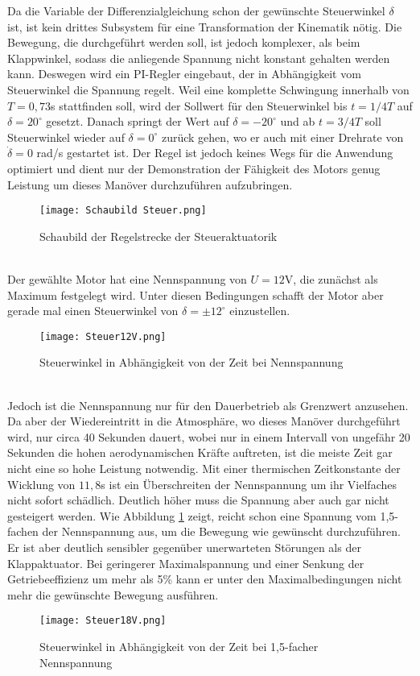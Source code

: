Da die Variable der Differenzialgleichung schon der gewünschte Steuerwinkel $\delta$ ist, ist kein drittes Subsystem für eine Transformation der Kinematik nötig. Die Bewegung, die durchgeführt werden soll, ist jedoch komplexer, als beim Klappwinkel, sodass die anliegende Spannung nicht konstant gehalten werden kann. Deswegen wird ein PI-Regler eingebaut, der in Abhängigkeit vom Steuerwinkel die Spannung regelt.
Weil eine komplette Schwingung innerhalb von $T = 0,73$s stattfinden soll, wird der Sollwert für den Steuerwinkel bis $t = 1/4T$ auf $\delta = 20^\circ$ gesetzt. Danach springt der Wert auf $\delta = -20^\circ$ und ab $t = 3/4T$ soll Steuerwinkel wieder auf $\delta = 0^\circ$ zurück gehen, wo er auch mit einer Drehrate von $\dot{\delta} = 0$ rad/s gestartet ist.
Der Regel ist jedoch keines Wegs für die Anwendung optimiert und dient nur der Demonstration der Fähigkeit des Motors genug Leistung um dieses Manöver durchzuführen aufzubringen.
\begin{figure}[h] 
	\centering
	\texttt{[image: Schaubild Steuer.png]}
	\caption{Schaubild der Regelstrecke der Steueraktuatorik}
\end{figure}\\
Der gewählte Motor hat eine Nennspannung von $U = 12$V, die zunächst als Maximum festgelegt wird. Unter diesen Bedingungen schafft der Motor aber gerade mal einen Steuerwinkel von $\delta = \pm 12^\circ$ einzustellen.
\begin{figure}[h] 
	\centering
	\texttt{[image: Steuer12V.png]}
	\caption{Steuerwinkel in Abhängigkeit von der Zeit bei Nennspannung}
\end{figure}\\
 Jedoch ist die Nennspannung nur für den Dauerbetrieb als Grenzwert anzusehen. Da aber der Wiedereintritt in die Atmosphäre, wo dieses Manöver durchgeführt wird, nur circa 40 Sekunden dauert, wobei nur in einem Intervall von ungefähr 20 Sekunden die hohen aerodynamischen Kräfte auftreten, ist die meiste Zeit gar nicht eine so hohe Leistung notwendig. Mit einer thermischen Zeitkonstante der Wicklung von $11,8$s ist ein Überschreiten der Nennspannung um ihr Vielfaches nicht sofort schädlich. Deutlich höher muss die Spannung aber auch gar nicht gesteigert werden. Wie Abbildung \ref{abb_Steuer18V} zeigt, reicht schon eine Spannung vom 1,5-fachen der Nennspannung aus, um die Bewegung wie gewünscht durchzuführen. Er ist aber deutlich sensibler gegenüber unerwarteten Störungen als der Klappaktuator. Bei geringerer Maximalspannung und einer Senkung der Getriebeeffizienz um mehr als 5\% kann er unter den Maximalbedingungen nicht mehr die gewünschte Bewegung ausführen.
\begin{figure}[h] 
\centering
\texttt{[image: Steuer18V.png]}
\caption{Steuerwinkel in Abhängigkeit von der Zeit bei 1,5-facher Nennspannung}
\label{abb_Steuer18V}
\end{figure}\\
